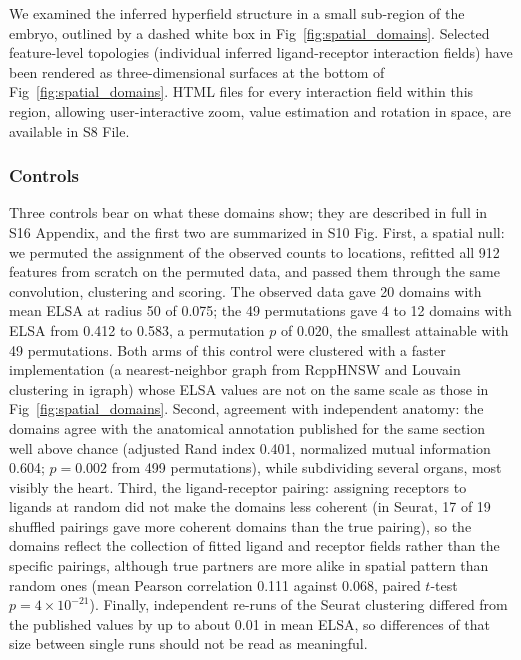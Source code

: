 \documentclass[10pt,letterpaper]{article}
\begin{document}
We examined the inferred hyperfield structure in a small sub-region of the embryo, outlined by a dashed white box in Fig~\ref{fig:spatial_domains}. Selected feature-level topologies (individual inferred ligand-receptor interaction fields) have been rendered as three-dimensional surfaces at the bottom of Fig~\ref{fig:spatial_domains}. HTML files for every interaction field within this region, allowing user-interactive zoom, value estimation and rotation in space, are available in S8 File.

\subsubsection*{Controls}
\label{sec:controls}

Three controls bear on what these domains show; they are described in full in S16 Appendix, and the first two are summarized in S10 Fig. First, a spatial null: we permuted the assignment of the observed counts to locations, refitted all 912 features from scratch on the permuted data, and passed them through the same convolution, clustering and scoring. The observed data gave 20 domains with mean ELSA at radius 50 of 0.075; the 49 permutations gave 4 to 12 domains with ELSA from 0.412 to 0.583, a permutation $p$ of 0.020, the smallest attainable with 49 permutations. Both arms of this control were clustered with a faster implementation (a nearest-neighbor graph from RcppHNSW and Louvain clustering in igraph) whose ELSA values are not on the same scale as those in Fig~\ref{fig:spatial_domains}. Second, agreement with independent anatomy: the domains agree with the anatomical annotation published for the same section \cite{Chen2022} well above chance (adjusted Rand index 0.401, normalized mutual information 0.604; $p = 0.002$ from 499 permutations), while subdividing several organs, most visibly the heart. Third, the ligand-receptor pairing: assigning receptors to ligands at random did not make the domains less coherent (in Seurat, 17 of 19 shuffled pairings gave more coherent domains than the true pairing), so the domains reflect the collection of fitted ligand and receptor fields rather than the specific pairings, although true partners are more alike in spatial pattern than random ones (mean Pearson correlation 0.111 against 0.068, paired $t$-test $p = 4\times10^{-21}$). Finally, independent re-runs of the Seurat clustering differed from the published values by up to about 0.01 in mean ELSA, so differences of that size between single runs should not be read as meaningful.
\end{document}
